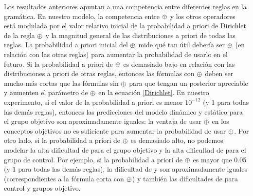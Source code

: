Los resultados anteriores apuntan a una competencia entre diferentes reglas en la gramática. En nuestro modelo, la competencia entre $ \oplus $ y los otros operadores está modulada por el valor relativo inicial de la probabilidad a priori de Dirichlet de la regla $ \oplus $ y la magnitud general de las distribuciones a priori de todas las reglas. La probabilidad a priori inicial del $ \oplus $ mide qué tan útil debería ser $ \oplus $ (en relación con las otras reglas) para aumentar la probabilidad de usarlo en el futuro. Si la probabilidad a priori de $ \oplus $ es demasiado bajo en relación con las distribuciones a priori de otras reglas, entonces las fórmulas con $ \oplus $ deben ser mucho más cortas que las fórmulas sin $ \oplus $ para que tengan un posterior apreciable y aumenten el parámetro de $ \oplus $ en la ecuación \eqref{Dirichlet}. En nuestro experimento, si el valor de la probabilidad a priori es menor $ 10^{- 12} $ (y 1 para todas las demás reglas), entonces las predicciones del modelo dinámico y estático para el grupo objetivo son aproximadamente iguales: la ventaja de usar $ \oplus $ en los conceptos objetivos no es suficiente para aumentar la probabilidad de usar $ \oplus $. Por otro lado, si la probabilidad a priori de $ \oplus $ es demasiado alto, no podemos modelar la alta dificultad de \targetb para el grupo objetivo y la alta dificultad de \testa para el grupo de control. Por ejemplo, si la probabilidad a priori de $ \oplus $ es mayor que 0.05 (y 1 para todas las demás reglas), la dificultad de \targetb y \targetd son aproximadamente iguales (correspondientes a la fórmula corta con $ \oplus $) y también las dificultades de \testa para control y grupos objetivo. 

